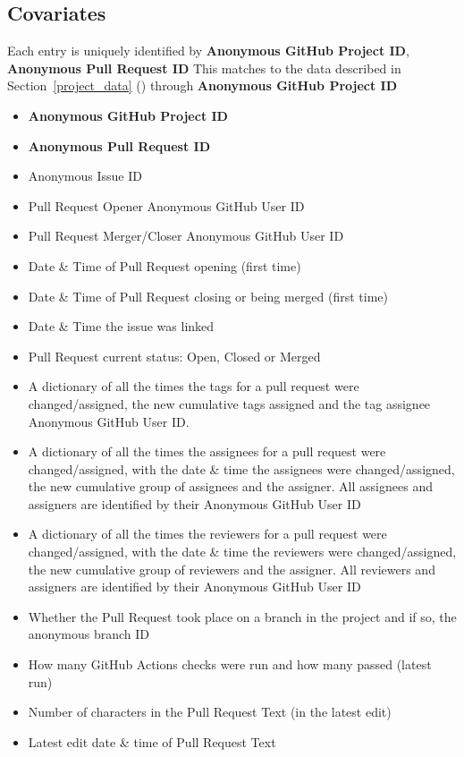 \documentclass[12pt,notitlepage]{article}
\begin{document}
\subsection*{Covariates}
Each entry is uniquely identified by \textbf{Anonymous GitHub Project ID}, \textbf{Anonymous Pull Request ID} 
This matches to the data described in Section~\ref{project_data} () through \textbf{Anonymous GitHub Project ID} 
\begin{itemize}
    \item \textbf{Anonymous GitHub Project ID}
    \item \textbf{Anonymous Pull Request ID}
    \item Anonymous Issue ID
    \item Pull Request Opener Anonymous GitHub User ID
    \item Pull Request Merger/Closer Anonymous GitHub User ID
    \item Date \& Time of Pull Request opening (first time)
    \item Date \& Time of Pull Request closing or being merged (first time)
    \item Date \& Time the issue was linked
    \item Pull Request current status: Open, Closed or Merged
    \item A dictionary of all the times the tags for a pull request were changed/assigned, the new cumulative tags assigned and the tag assignee Anonymous GitHub User ID.
    \item A dictionary of all the times the assignees for a pull request were changed/assigned, with the date \& time the assignees were changed/assigned, the new cumulative group of assignees and the assigner. All assignees and assigners are identified by their Anonymous GitHub User ID
    \item A dictionary of all the times the reviewers for a pull request were changed/assigned, with the date \& time the reviewers were changed/assigned, the new cumulative group of reviewers and the assigner. All reviewers and assigners are identified by their Anonymous GitHub User ID
    \item Whether the Pull Request took place on a branch in the project and if so, the anonymous branch ID
    \item How many GitHub Actions checks were run and how many passed (latest run)
    \item Number of characters in the Pull Request Text (in the latest edit)
    \item Latest edit date \& time of Pull Request Text

\end{itemize}
\end{document}
